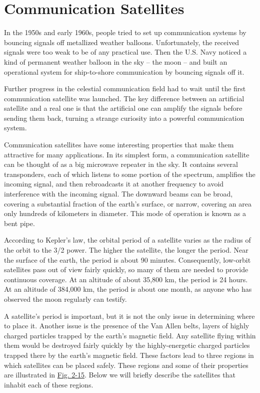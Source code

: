 \documentclass[b5paper,11pt]{memoir}
\begin{document}
\protect\hypertarget{0130661023_ch02lev1sec4.htmlux5cux23ch02lev1sec4}{}{}

\section{Communication Satellites}

In the 1950s and early 1960s, people tried to set up communication
systems by bouncing signals off metallized weather balloons.
Unfortunately, the received signals were too weak to be of any practical
use. Then the U.S. Navy noticed a kind of permanent weather balloon in
the sky -- the moon -- and built an operational system for ship-to-shore
communication by bouncing signals off it.

Further progress in the celestial communication field had to wait until
the first communication satellite was launched. The key difference
between an artificial satellite and a real one is that the artificial
one can amplify the signals before sending them back, turning a strange
curiosity into a powerful communication system.

Communication satellites have some interesting properties that make them
attractive for many applications. In its simplest form, a communication
satellite can be thought of as a big microwave repeater in the sky. It
contains several {transponders}, each of which listens to some portion
of the spectrum, amplifies the incoming signal, and then rebroadcasts it
at another frequency to avoid interference with the incoming signal. The
downward beams can be broad, covering a substantial fraction of the
earth's surface, or narrow, covering an area only hundreds of kilometers
in diameter. This mode of operation is known as a {bent pipe}.

According to Kepler's law, the orbital period of a satellite varies as
the radius of the orbit to the 3/2 power. The higher the satellite, the
longer the period. Near the surface of the earth, the period is about 90
minutes. Consequently, low-orbit satellites pass out of view fairly
quickly, so many of them are needed to provide continuous coverage. At
an altitude of about 35,800 km, the period is 24 hours. At an altitude
of 384,000 km, the period is about one month, as anyone who has observed
the moon regularly can testify.

A satellite's period is important, but it is not the only issue in
determining where to place it. Another issue is the presence of the Van
Allen belts, layers of highly charged particles trapped by the earth's
magnetic field. Any satellite flying within them would be destroyed
fairly quickly by the highly-energetic charged particles trapped there
by the earth's magnetic field. These factors lead to three regions in
which satellites can be placed safely. These regions and some of their
properties are illustrated in
\protect\hyperlink{0130661023_ch02lev1sec4.htmlux5cux23ch02fig15}{Fig.
2-15}. Below we will briefly describe the satellites that inhabit each
of these regions.
\end{document}
